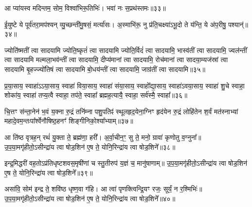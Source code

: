 {\anuvakamend[{त॒रणि॑र्विꣳश॒तिः॥31॥}]}

आ प्या॑यस्व मदिन्तम॒ सोम॒ विश्वा॑भिरू॒तिभिः॑। भवा॑ नः स॒प्रथ॑स्तमः॥३३॥

{\anuvakamend[{आ प्या॑यस्व॒ नव॑॥32॥}]}

ई॒युष्टे ये पूर्व॑तरा॒मप॑श्यन् व्यु॒च्छन्ती॑मु॒षसं॒ मर्त्या॑सः। अ॒स्माभि॑रू॒ नु प्र॑ति॒चक्ष्या॑\-ऽभू॒दो ते य॑न्ति॒ ये अ॑प॒रीषु॒ पश्यान्॑॥३४॥

{\anuvakamend[{ई॒युरेका॒न्नविꣳ॑शतिः॥33॥}]}

ज्योति॑ष्मतीं त्वा सादयामि ज्योति॒ष्कृतं॑ त्वा सादयामि ज्योति॒र्विदं॑ त्वा सादयामि॒ भास्व॑तीं त्वा सादयामि॒ ज्वल॑न्तीं त्वा सादयामि मल्मला॒भव॑न्तीं त्वा सादयामि॒ दीप्य॑मानां त्वा सादयामि॒ रोच॑मानां त्वा सादया॒म्यज॑स्रां त्वा सादयामि बृ॒हज्ज्यो॑तिषं त्वा सादयामि बो॒धय॑न्तीं त्वा सादयामि॒ जाग्र॑तीं त्वा सादयामि॥३५॥

{\anuvakamend[{ज्योति॑ष्मती॒ꣳ॒ षट्त्रिꣳ॑शत्॥34॥}]}

प्र॒या॒साय॒ स्वाहा॑\-ऽ\-ऽया॒साय॒ स्वाहा॑ विया॒साय॒ स्वाहा॑ संया॒साय॒ स्वाहो᳚द्या॒साय॒ स्वाहा॑\-ऽवया॒साय॒ स्वाहा॑ शु॒चे स्वाहा॒ शोका॑य॒ स्वाहा॑ तप्य॒त्वै स्वाहा॒ तप॑ते॒ स्वाहा᳚ ब्रह्मह॒त्यायै॒ स्वाहा॒ सर्व॑स्मै॒ स्वाहा᳚॥३६॥

{\anuvakamend[{प्र॒या॒साय॒ चतु॑र्विꣳशतिः॥35॥}]}

चि॒त्तꣳ स॑न्ता॒नेन॑ भ॒वं य॒क्ना रु॒द्रं तनि॑म्ना पशु॒पतिꣴ॑ स्थूलहृद॒येना॒ग्निꣳ हृद॑येन रु॒द्रं लोहि॑तेन श॒र्वं मत॑स्नाभ्यां महादे॒वम॒न्तःपा᳚र्श्वेनौषिष्ठ॒हनꣳ॑ शिङ्गीनिको॒श्या᳚भ्याम्॥३७॥

{\anuvakamend[{चि॒त्तम॒ष्टाद॑श॥36॥}]}

आ ति॑ष्ठ वृत्रह॒न् रथं॑ यु॒क्ता ते॒ ब्रह्म॑णा॒ हरी᳚। अ॒र्वा॒चीन॒ꣳ॒ सु ते॒ मनो॒ ग्रावा॑ कृणोतु व॒ग्नुना᳚॥ उ॒प॒या॒मगृ॑हीतो॒\-ऽसीन्द्रा॑य त्वा षोड॒शिन॑ ए॒ष ते॒ योनि॒रिन्द्रा॑य त्वा षोड॒शिने᳚॥३८॥

{\anuvakamend[{आ ति॑ष्ठ॒ षड्विꣳ॑शतिः॥37॥}]}

इन्द्र॒मिद्धरी॑ वह॒तो\-ऽप्र॑तिधृष्टशवस॒मृषी॑णां च स्तु॒तीरुप॑ य॒ज्ञं च॒ मानु॑षाणाम्॥ उ॒प॒या॒मगृ॑हीतो॒\-ऽसीन्द्रा॑य त्वा षोड॒शिन॑ ए॒ष ते॒ योनि॒रिन्द्रा॑य त्वा षोड॒शिने᳚॥३९॥

{\anuvakamend[{इन्द्र॒मित्त्रयो॑विꣳशतिः॥38॥}]}

असा॑वि॒ सोम॑ इन्द्र ते॒ शवि॑ष्ठ धृष्ण॒वा ग॑हि। आ त्वा॑ पृणक्त्विन्द्रि॒यꣳ रजः॒ सूर्यं॒ न र॒श्मिभिः॑॥ उ॒प॒या॒मगृ॑हीतो॒\-ऽसीन्द्रा॑य त्वा षोड॒शिन॑ ए॒ष ते॒ योनि॒रिन्द्रा॑य त्वा षोड॒शिने᳚॥४०॥

